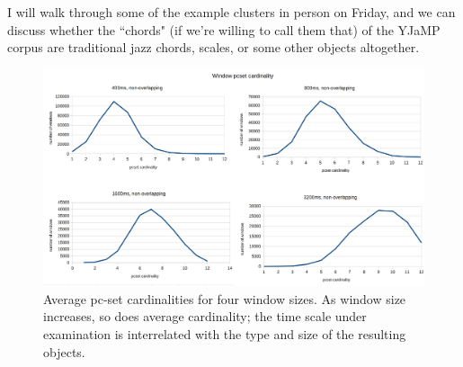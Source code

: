 I will walk through some of the example clusters in person on Friday, and we can discuss whether the ``chords" (if we're willing to call them that) of the YJaMP corpus are traditional jazz chords, scales, or some other objects altogether.



\begin{landscape}
\begin{figure}
	\centering
	\includegraphics[width=8in]{cardinalities.jpg}
	\caption{Average pc-set cardinalities for four window sizes.  As window size increases, so does average cardinality; the time scale under examination is interrelated with the type and size of the resulting objects.}
	\label{cardinalities}
\end{figure}
\end{landscape}


